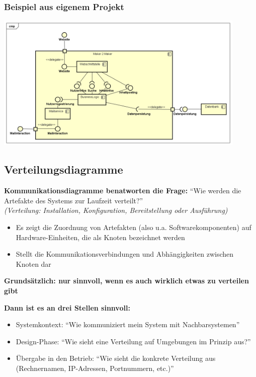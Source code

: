 \documentclass[11pt, a4paper]{article}
\begin{document}
\raggedright \subsubsection*{Beispiel aus eigenem Projekt}

\centering \includegraphics[width=0.9\textwidth]{Komponenten-01.png}

\newpage



\raggedright \subsection{Verteilungsdiagramme}

\vspace{1em}

\textbf{Kommunikationsdiagramme benatworten die Frage:} “Wie werden die Artefakte des Systems zur Laufzeit verteilt?” \\
\tiny \textit{(Verteilung: Installation, Konfiguration, Bereitstellung oder Ausführung)}

\small
\begin{itemize}
    \item Es zeigt die Zuordnung von Artefakten (also u.a. Softwarekomponenten) auf Hardware-Einheiten, die als Knoten bezeichnet werden
    \item Stellt die Kommunikationsverbindungen und Abhängigkeiten zwischen Knoten dar
\end{itemize}

\vspace{2em}

\raggedright \textbf{Grundsätzlich: nur sinnvoll, wenn es auch wirklich etwas zu verteilen gibt}

\textbf{Dann ist es an drei Stellen sinnvoll:}
\begin{itemize}
    \item Systemkontext: “Wie kommuniziert mein System mit Nachbarsystemen”
    \item Design-Phase: “Wie sieht eine Verteilung auf Umgebungen im Prinzip aus?”
    \item Übergabe in den Betrieb: “Wie sieht die konkrete Verteilung aus (Rechnernamen, IP-Adressen, Portnummern, etc.)”
\end{itemize}
\end{document}
